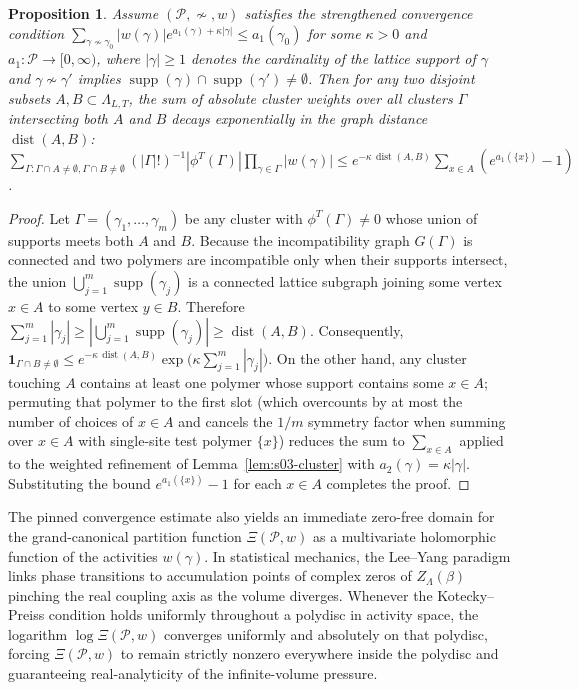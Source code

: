 \documentclass[11pt]{article}
\newtheorem{proposition}[theorem]{Proposition}
\theoremstyle{definition}
\begin{document}
\begin{proposition}
\label{prop:s03-cumulant-decay}
Assume $(\mathcal{P}, \not\sim, w)$ satisfies the strengthened convergence condition
$\sum_{\gamma \not\sim \gamma_0} |w(\gamma)| e^{a_1(\gamma) + \kappa |\gamma|} \le
a_1(\gamma_0)$ for some $\kappa > 0$ and $a_1 : \mathcal{P} \to [0, \infty)$, where
$|\gamma| \ge 1$ denotes the cardinality of the lattice support of $\gamma$ and
$\gamma \not\sim \gamma'$ implies $\operatorname{supp}(\gamma) \cap
\operatorname{supp}(\gamma') \neq \emptyset$. Then for any two disjoint subsets $A,
B \subset \Lambda_{L,T}$, the sum of absolute cluster weights over all clusters
$\Gamma$ intersecting both $A$ and $B$ decays exponentially in the graph distance
$\operatorname{dist}(A, B)$: $\sum_{\Gamma : \Gamma \cap A \neq \emptyset, \Gamma
\cap B \neq \emptyset} (|\Gamma|!)^{-1} |\phi^T(\Gamma)| \prod_{\gamma \in \Gamma}
|w(\gamma)| \le e^{-\kappa \, \operatorname{dist}(A, B)} \sum_{x \in A}
(e^{a_1(\{x\})} - 1)$.
\end{proposition}
\begin{proof}
Let $\Gamma = (\gamma_1, \dots, \gamma_m)$ be any cluster with $\phi^T(\Gamma) \neq
0$ whose union of supports meets both $A$ and $B$. Because the incompatibility graph
$G(\Gamma)$ is connected and two polymers are incompatible only when their supports
intersect, the union $\bigcup_{j=1}^m \operatorname{supp}(\gamma_j)$ is a connected
lattice subgraph joining some vertex $x \in A$ to some vertex $y \in B$. Therefore
$\sum_{j=1}^m |\gamma_j| \ge |\bigcup_{j=1}^m \operatorname{supp}(\gamma_j)| \ge
\operatorname{dist}(A, B)$. Consequently, $\mathbf{1}_{\Gamma \cap B \neq \emptyset}
\le e^{-\kappa \, \operatorname{dist}(A, B)} \exp\!\bigl(\kappa \sum_{j=1}^m
|\gamma_j|\bigr)$. On the other hand, any cluster touching $A$ contains at least one
polymer whose support contains some $x \in A$; permuting that polymer to the first
slot (which overcounts by at most the number of choices of $x \in A$ and cancels the
$1/m$ symmetry factor when summing over $x \in A$ with single-site test polymer
$\{x\}$) reduces the sum to $\sum_{x \in A}$ applied to the weighted refinement of
Lemma~\ref{lem:s03-cluster} with $a_2(\gamma) = \kappa |\gamma|$. Substituting the
bound $e^{a_1(\{x\})} - 1$ for each $x \in A$ completes the proof.
\end{proof}

The pinned convergence estimate also yields an immediate zero-free domain for the
grand-canonical partition function $\Xi(\mathcal{P}, w)$ as a multivariate
holomorphic function of the activities $w(\gamma)$. In statistical mechanics, the
Lee--Yang paradigm links phase transitions to accumulation points of complex zeros
of $Z_\Lambda(\beta)$ pinching the real coupling axis as the volume diverges.
Whenever the Kotecky--Preiss condition holds uniformly throughout a polydisc in
activity space, the logarithm $\log \Xi(\mathcal{P}, w)$ converges uniformly and
absolutely on that polydisc, forcing $\Xi(\mathcal{P}, w)$ to remain strictly
nonzero everywhere inside the polydisc and guaranteeing real-analyticity of the
infinite-volume pressure.
\end{document}
